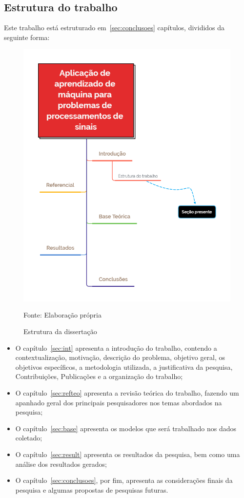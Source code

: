 \subsection{Estrutura do trabalho} \label{subsec:estrutura}
    Este trabalho está estruturado em~\ref{sec:conclusoes} capítulos, divididos da seguinte forma:
    
    \begin{figure}[H]
    	\centering
    	\caption{Estrutura da dissertação}
    	\label{fig:estrutura}
    	\includegraphics[width=0.7\linewidth]{Introducao/Figuras/Estrutura}
    	
    	Fonte: Elaboração própria 
    \end{figure}
    
    
    \begin{itemize}
        \item O capítulo~\ref{sec:int} apresenta a introdução do trabalho, contendo a contextualização, motivação, descrição do problema, objetivo geral, os objetivos específicos, a metodologia utilizada, a justificativa da pesquisa, Contribuições, Publicações e a organização do trabalho;
        \item O capítulo~\ref{sec:refteo} apresenta a revisão teórica do trabalho, fazendo um apanhado geral dos principais pesquisadores nos temas abordados na pesquisa;
       \item O capítulo~\ref{sec:base} apresenta os modelos que será trabalhado nos dados coletado;
        \item O capítulo~\ref{sec:result} apresenta os resultados da pesquisa, bem como uma análise dos resultados gerados;
        \item O capítulo~\ref{sec:conclusoes}, por fim, apresenta as considerações finais da pesquisa e algumas propostas de pesquisas futuras.
    \end{itemize}
    
    
    